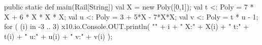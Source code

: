 %   
% 
\begin{xten}
  public static def main(Rail[String]) {
     val X = new Poly([0,1]);
     val t <: Poly = 7 * X + 6 * X * X * X; 
     val u <: Poly = 3 + 5*X - 7*X*X;
     val v <: Poly = t * u - 1;
     for ( (i) in -3 .. 3) {
       x10.io.Console.OUT.println(
         "" + i + "	X:" + X(i) + "	t:" + t(i) 
         + "	u:" + u(i) + "	v:" + v(i)
         );
     }
  }

\end{xten}

